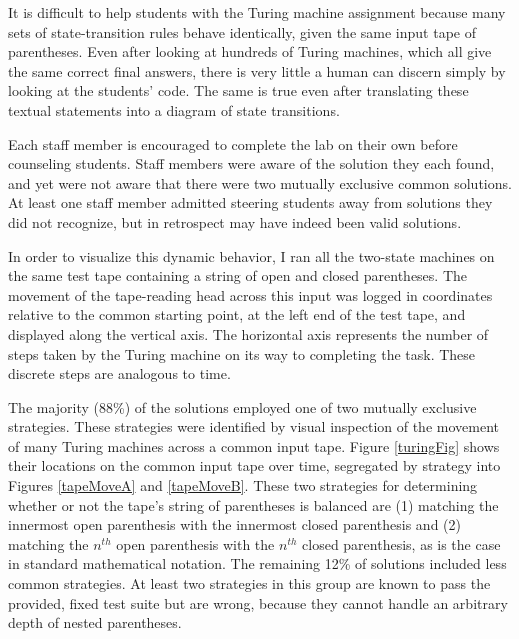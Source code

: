 \documentclass[12pt]{article}
\begin{document}
It is difficult to help students with the Turing machine assignment because many sets of state-transition rules behave identically, given the same input tape of parentheses. Even after looking at hundreds of Turing machines, which all give the same correct final answers, there is very little a human can discern simply by looking at the students' code. The same is true even after translating these textual statements into a diagram of state transitions.

Each staff member is encouraged to complete the lab on their own before counseling students. Staff members were aware of the solution they each found, and yet were not aware that there were two mutually exclusive common solutions. At least one staff member admitted steering students away from solutions they did not recognize, but in retrospect may have indeed been valid solutions.

In order to visualize this dynamic behavior, I ran all the two-state machines on the same test tape containing a string of open and closed parentheses. The movement of the tape-reading head across this input was logged in coordinates relative to the common starting point, at the left end of the test tape, and displayed along the vertical axis. The horizontal axis represents the number of steps taken by the Turing machine on its way to completing the task. These discrete steps are analogous to time. 

The majority (88\%) of the solutions employed one of two mutually exclusive strategies. These strategies were identified by visual inspection of the movement of many Turing machines across a common input tape. Figure \ref{turingFig} shows their locations on the common input tape over time, segregated by strategy into Figures \ref{tapeMoveA} and \ref{tapeMoveB}. These two strategies for determining whether or not the tape's string of parentheses is balanced are (1) matching the innermost open parenthesis with the innermost closed parenthesis and (2) matching the $n^{th}$ open parenthesis with the $n^{th}$ closed parenthesis, as is the case in standard mathematical notation. The remaining 12\% of solutions included less common strategies. At least two strategies in this group are known to pass the provided, fixed test suite but are wrong, because they cannot handle an arbitrary depth of nested parentheses. %
\end{document}
